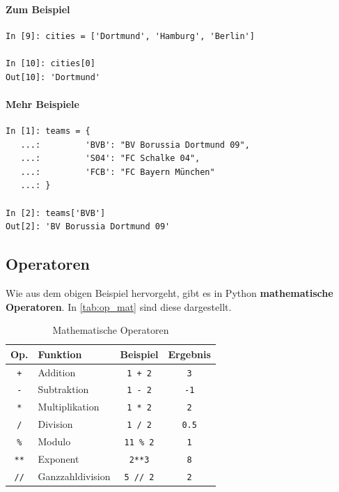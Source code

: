 \paragraph{Zum Beispiel}
\begin{verbatim}
In [9]: cities = ['Dortmund', 'Hamburg', 'Berlin']

In [10]: cities[0]
Out[10]: 'Dortmund'
\end{verbatim}
\paragraph{Mehr Beispiele}
\begin{verbatim}
In [1]: teams = {
   ...:         'BVB': "BV Borussia Dortmund 09",
   ...:         'S04': "FC Schalke 04",
   ...:         'FCB': "FC Bayern München"
   ...: }

In [2]: teams['BVB']
Out[2]: 'BV Borussia Dortmund 09'
\end{verbatim}


\subsection{Operatoren}
Wie aus dem obigen Beispiel hervorgeht, gibt es in Python \textbf{mathematische Operatoren}.
In \autoref{tab:op_mat} sind diese dargestellt.

\begin{table}[H]
  \centering{}
  \caption{Mathematische Operatoren}
  \label{tab:op_mat}
  \begin{tabular}{c l c c}
    \toprule
    Op.         & Funktion         & Beispiel         & Ergebnis \\
    \midrule
    \texttt{+}  & Addition         & \texttt{1 + 2}   & \texttt{3} \\
    \texttt{-}  & Subtraktion      & \texttt{1 - 2}   & \texttt{-1} \\
    \texttt{*}  & Multiplikation   & \texttt{1 * 2}   & \texttt{2} \\
    \texttt{/}  & Division         & \texttt{1 / 2}   & \texttt{0.5} \\
    \texttt{\%} & Modulo           & \texttt{11 \% 2} & \texttt{1} \\
    \texttt{**} & Exponent         & \texttt{2**3}  & \texttt{8} \\
    \texttt{//} & Ganzzahldivision & \texttt{5 // 2}  & \texttt{2} \\
    \bottomrule
  \end{tabular}
\end{table}

